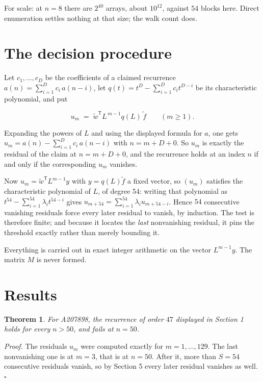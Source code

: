 \documentclass[11pt]{article}
\newtheorem{theorem}{Theorem}
\theoremstyle{definition}
\begin{document}
For scale: at $n = 8$ there are $2^{40}$ arrays, about $10^{12}$, against $54$ blocks here. Direct enumeration settles nothing at that size; the walk count does.

\section{The decision procedure}

Let $c_1,\dots,c_D$ be the coefficients of a claimed recurrence $a(n) = \sum_{i=1}^{D} c_i\,a(n-i)$, let $q(t) = t^{D} - \sum_{i=1}^{D} c_i t^{D-i}$ be its characteristic polynomial, and put

\[u_m \;=\; \tilde w^{\mathsf T} L^{\,m-1} q(L)\,\tilde f \qquad (m \ge 1).\]

Expanding the powers of $L$ and using the displayed formula for $a$, one gets $u_m = a(n) - \sum_{i=1}^{D} c_i\,a(n-i)$ with $n = m + D + 0$. So $u_m$ is exactly the residual of the claim at $n = m + D + 0$, and the recurrence holds at an index $n$ if and only if the corresponding $u_m$ vanishes.

Now $u_m = \tilde w^{\mathsf T} L^{m-1} y$ with $y = q(L)\tilde f$ a fixed vector, so $(u_m)$ satisfies the characteristic polynomial of $L$, of degree $54$: writing that polynomial as $t^{54} - \sum_{i=1}^{54} \lambda_i t^{54-i}$ gives $u_{m+54} = \sum_{i=1}^{54} \lambda_i u_{m+54-i}$. Hence $54$ consecutive vanishing residuals force every later residual to vanish, by induction. The test is therefore finite; and because it locates the {\itshape last} nonvanishing residual, it pins the threshold exactly rather than merely bounding it.

Everything is carried out in exact integer arithmetic on the vector $L^{m-1}y$. The matrix $M$ is never formed.

\section{Results}

\begin{theorem} For A207898, the recurrence of order $47$ displayed in Section 1 holds for every $n > 50$, and fails at $n = 50$.\end{theorem}

{\itshape Proof.} The residuals $u_m$ were computed exactly for $m = 1,\dots,129$. The last nonvanishing one is at $m = 3$, that is at $n = 50$. After it, more than $S = 54$ consecutive residuals vanish, so by Section 5 every later residual vanishes as well. $\square$
\end{document}
